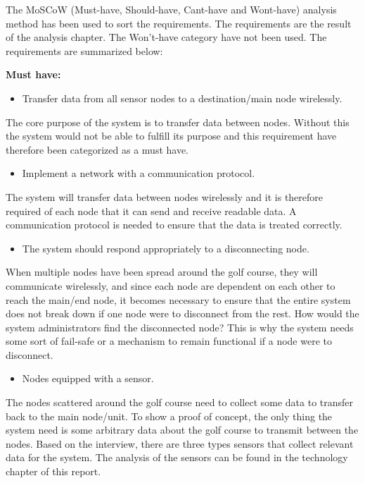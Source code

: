 The MoSCoW (Must-have, Should-have, Cant-have and Wont-have) analysis method has been used to sort the requirements. The requirements are the result of the analysis chapter. The Won't-have category have not been used. The requirements are summarized below:

\textbf{Must have:}
\begin{itemize}
\item Transfer data from all sensor nodes to a destination/main node wirelessly.
\end{itemize}
The core purpose of the system is to transfer data between nodes. Without this the system would not be able to fulfill its purpose and this requirement have therefore been categorized as a must have.


\begin{itemize}
\item Implement a network with a communication protocol.
\end{itemize}
The system will transfer data between nodes wirelessly and it is therefore required of each node that it can send and receive readable data. A communication protocol is needed to ensure that the data is treated correctly.


\begin{itemize}
\item The system should respond appropriately to a disconnecting node.
\end{itemize}
When multiple nodes have been spread around the golf course, they will communicate wirelessly, and since each node are dependent on each other to reach the main/end node, it becomes necessary to ensure that the entire system does not break down if one node were to disconnect from the rest. How would the system administrators find the disconnected node? This is why the system needs some sort of fail-safe or a mechanism to remain functional if a node were to disconnect.


\begin{itemize}
\item Nodes equipped with a sensor.
\end{itemize}
The nodes scattered around the golf course need to collect some data to transfer back to the main node/unit. To show a proof of concept, the only thing the system need is some arbitrary data about the golf course to transmit between the nodes. Based on the interview, there are three types sensors that collect relevant data for the system. The analysis of the sensors can be found in the technology chapter of this report.


